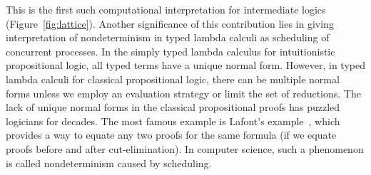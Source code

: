 This is the first such computational
interpretation for intermediate logics (Figure~\ref{fig:lattice}).
Another significance of this contribution
lies in giving interpretation of nondeterminism in typed
lambda calculi as scheduling of concurrent processes.
In the simply typed lambda calculus for intuitionistic
propositional logic, all typed terms have a unique normal form.
However, in typed lambda calculi for classical propositional logic,
there can be multiple normal forms unless we employ an evaluation
strategy or limit the set of reductions.
The lack of unique normal forms in the classical propositional proofs
has puzzled logicians for decades.
The most famous example is Lafont's
example~\citep[B.1.]{girard1989proofs}, which provides a way to equate
any two proofs for the same formula (if we equate proofs before and
after cut-elimination).
In computer science, such a phenomenon is called nondeterminism caused by scheduling.
